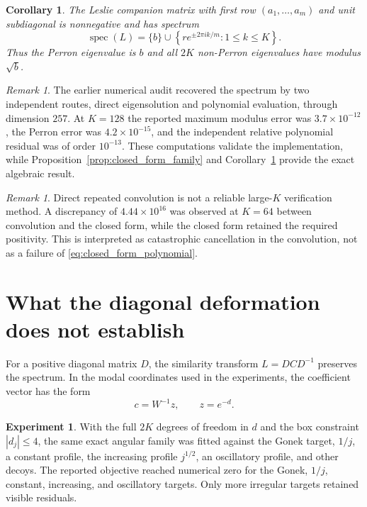 \documentclass[11pt]{amsart}
\numberwithin{equation}{section}
\theoremstyle{plain}
\newtheorem{corollary}[theorem]{Corollary}
\theoremstyle{definition}
\newtheorem{experiment}[theorem]{Experiment}
\theoremstyle{remark}
\newtheorem{remark}[theorem]{Remark}
\begin{document}
\begin{corollary}
\label{cor:exact_spectrum}
The Leslie companion matrix with first row $(a_1,\ldots,a_m)$ and unit subdiagonal is nonnegative and has spectrum
\begin{equation}
\operatorname{spec}(L)=\{b\}\cup
\left\{r e^{\pm 2\pi i k/m}:1\leq k\leq K\right\}.
\label{eq:exact_leslie_spectrum}
\end{equation}
Thus the Perron eigenvalue is $b$ and all $2K$ non-Perron eigenvalues have modulus $\sqrt b$.
\end{corollary}

\begin{remark}
\label{rem:numerical_validation_exact_family}
The earlier numerical audit recovered the spectrum by two independent routes, direct eigensolution and polynomial evaluation, through dimension $257$.  At $K=128$ the reported maximum modulus error was $3.7\times10^{-12}$, the Perron error was $4.2\times10^{-15}$, and the independent relative polynomial residual was of order $10^{-13}$.  These computations validate the implementation, while Proposition~\ref{prop:closed_form_family} and Corollary~\ref{cor:exact_spectrum} provide the exact algebraic result.
\end{remark}

\begin{remark}
\label{rem:convolution_failure}
Direct repeated convolution is not a reliable large-$K$ verification method.  A discrepancy of $4.44\times10^{16}$ was observed at $K=64$ between convolution and the closed form, while the closed form retained the required positivity.  This is interpreted as catastrophic cancellation in the convolution, not as a failure of \eqref{eq:closed_form_polynomial}.
\end{remark}

\section{What the diagonal deformation does not establish}
\label{sec:diagonal_deformation}

For a positive diagonal matrix $D$, the similarity transform $L=DCD^{-1}$ preserves the spectrum.  In the modal coordinates used in the experiments, the coefficient vector has the form
\begin{equation}
c=W^{-1}z,
\qquad z=e^{-d}.
\label{eq:modal_coefficients_observable}
\end{equation}

\begin{experiment}
\label{exp:profile_flexibility}
With the full $2K$ degrees of freedom in $d$ and the box constraint $|d_j|\leq4$, the same exact angular family was fitted against the Gonek target, $1/j$, a constant profile, the increasing profile $j^{1/2}$, an oscillatory profile, and other decoys.  The reported objective reached numerical zero for the Gonek, $1/j$, constant, increasing, and oscillatory targets.  Only more irregular targets retained visible residuals.
\end{experiment}
\end{document}

